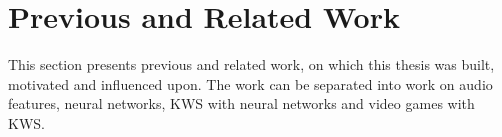
\chapter{Previous and Related Work}\label{sec:prev}
This section presents previous and related work, on which this thesis was built, motivated and influenced upon.
The work can be separated into work on audio features, neural networks, KWS with neural networks and video games with KWS.







